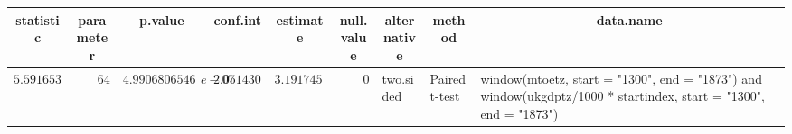 %
\begin{table}[!tbp]
\begin{center}
\begin{tabular}{rrrrrrlll}
\hline\hline
\multicolumn{1}{c}{statistic}&\multicolumn{1}{c}{parameter}&\multicolumn{1}{c}{p.value}&\multicolumn{1}{c}{conf.int}&\multicolumn{1}{c}{estimate}&\multicolumn{1}{c}{null.value}&\multicolumn{1}{c}{alternative}&\multicolumn{1}{c}{method}&\multicolumn{1}{c}{data.name}\tabularnewline
\hline
$5.59165398179906$&$64$&$4.99068065469382e-07$&$2.05143072513116$&$3.19174521701836$&$0$&two.sided&Paired t-test&window(mtoetz, start = "1300", end = "1873") and window(ukgdptz/1000 * startindex, start = "1300", end = "1873")\tabularnewline
\hline
\end{tabular}
\end{center}
\end{table}

